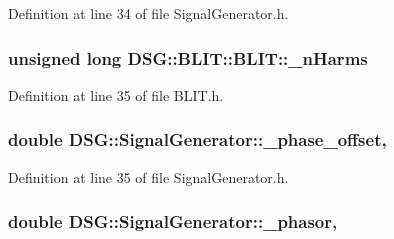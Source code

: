 Definition at line 34 of file Signal\-Generator.\-h.

\hypertarget{classDSG_1_1BLIT_1_1BLIT_a487cca5adfe04a902c97aad8061c6c99}{
\subsubsection[{\-\_\-n\-Harms}]{\setlength{\rightskip}{0pt plus 5cm}unsigned long D\-S\-G\-::\-B\-L\-I\-T\-::\-B\-L\-I\-T\-::\-\_\-n\-Harms\hspace{0.3cm}{\ttfamily [protected]}}}\label{classDSG_1_1BLIT_1_1BLIT_a487cca5adfe04a902c97aad8061c6c99}


Definition at line 35 of file B\-L\-I\-T.\-h.

\hypertarget{classDSG_1_1SignalGenerator_a9abf9d00c798e0fdca6314f17547758a}{
\subsubsection[{\-\_\-phase\-\_\-offset}]{\setlength{\rightskip}{0pt plus 5cm}double D\-S\-G\-::\-Signal\-Generator\-::\-\_\-phase\-\_\-offset\hspace{0.3cm}{\ttfamily [protected]}, {\ttfamily [inherited]}}}\label{classDSG_1_1SignalGenerator_a9abf9d00c798e0fdca6314f17547758a}


Definition at line 35 of file Signal\-Generator.\-h.

\hypertarget{classDSG_1_1SignalGenerator_ac2271b582bf699275f077ecb642a8cd9}{
\subsubsection[{\-\_\-phasor}]{\setlength{\rightskip}{0pt plus 5cm}double D\-S\-G\-::\-Signal\-Generator\-::\-\_\-phasor\hspace{0.3cm}{\ttfamily [protected]}, {\ttfamily [inherited]}}}\label{classDSG_1_1SignalGenerator_ac2271b582bf699275f077ecb642a8cd9}


